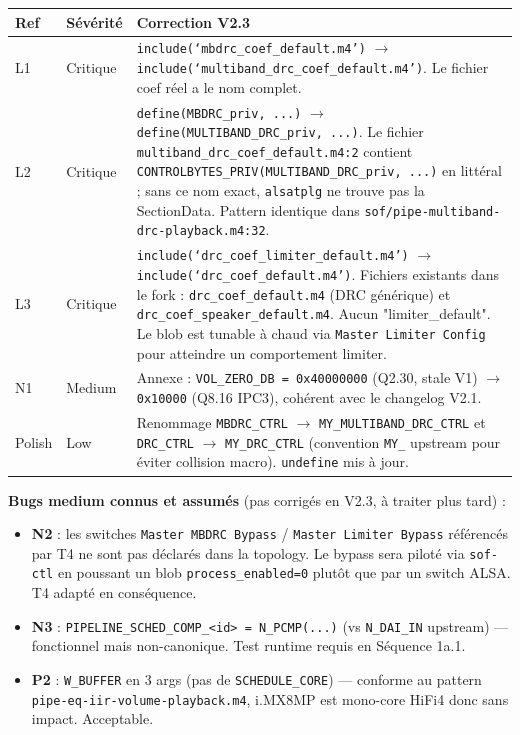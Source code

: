 \documentclass[11pt,a4paper]{article}
\begin{document}
\begin{center}
\begin{tabularx}{\textwidth}{llX}
\toprule
\textbf{Ref} & \textbf{Sévérité} & \textbf{Correction V2.3} \\
\midrule
L1 & Critique & \texttt{include(`mbdrc\_coef\_default.m4')} $\rightarrow$ \texttt{include(`multiband\_drc\_coef\_default.m4')}. Le fichier coef réel a le nom complet. \\
L2 & Critique & \texttt{define(MBDRC\_priv, ...)} $\rightarrow$ \texttt{define(MULTIBAND\_DRC\_priv, ...)}. Le fichier \texttt{multiband\_drc\_coef\_default.m4:2} contient \texttt{CONTROLBYTES\_PRIV(MULTIBAND\_DRC\_priv, ...)} en littéral ; sans ce nom exact, \texttt{alsatplg} ne trouve pas la SectionData. Pattern identique dans \texttt{sof/pipe-multiband-drc-playback.m4:32}. \\
L3 & Critique & \texttt{include(`drc\_coef\_limiter\_default.m4')} $\rightarrow$ \texttt{include(`drc\_coef\_default.m4')}. Fichiers existants dans le fork : \texttt{drc\_coef\_default.m4} (DRC générique) et \texttt{drc\_coef\_speaker\_default.m4}. Aucun "limiter\_default". Le blob est tunable à chaud via \texttt{Master Limiter Config} pour atteindre un comportement limiter. \\
N1 & Medium & Annexe : \texttt{VOL\_ZERO\_DB = 0x40000000} (Q2.30, stale V1) $\rightarrow$ \texttt{0x10000} (Q8.16 IPC3), cohérent avec le changelog V2.1. \\
Polish & Low & Renommage \texttt{MBDRC\_CTRL} $\rightarrow$ \texttt{MY\_MULTIBAND\_DRC\_CTRL} et \texttt{DRC\_CTRL} $\rightarrow$ \texttt{MY\_DRC\_CTRL} (convention \texttt{MY\_} upstream pour éviter collision macro). \texttt{undefine} mis à jour. \\
\bottomrule
\end{tabularx}
\end{center}

\textbf{Bugs medium connus et assumés} (pas corrigés en V2.3, à traiter plus tard) :
\begin{itemize}[leftmargin=*, itemsep=1pt]
  \item \textbf{N2} : les switches \texttt{Master MBDRC Bypass} / \texttt{Master Limiter Bypass} référencés par T4 ne sont pas déclarés dans la topology. Le bypass sera piloté via \texttt{sof-ctl} en poussant un blob \texttt{process\_enabled=0} plutôt que par un switch ALSA. T4 adapté en conséquence.
  \item \textbf{N3} : \texttt{PIPELINE\_SCHED\_COMP\_<id> = N\_PCMP(...)} (vs \texttt{N\_DAI\_IN} upstream) --- fonctionnel mais non-canonique. Test runtime requis en Séquence 1a.1.
  \item \textbf{P2} : \texttt{W\_BUFFER} en 3 args (pas de \texttt{SCHEDULE\_CORE}) --- conforme au pattern \texttt{pipe-eq-iir-volume-playback.m4}, i.MX8MP est mono-core HiFi4 donc sans impact. Acceptable.
\end{itemize}
\end{document}
